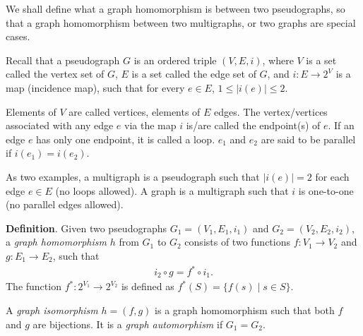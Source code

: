 \documentclass[12pt]{article}
\begin{document}
We shall define what a graph homomorphism is between two pseudographs, so that a graph homomorphism between two multigraphs, or two graphs are special cases.

Recall that a pseudograph $G$ is an ordered triple $(V,E,i)$, where $V$ is a set called the vertex set of $G$, $E$ is a set called the edge set of $G$, and $i:E\to 2^V$ is a map (incidence map), such that for every $e\in E$, $1\le |i(e)|\le 2$.  

Elements of $V$ are called vertices, elements of $E$ edges.  The vertex/vertices associated with any edge $e$ via the map $i$ is/are called the endpoint(s) of $e$.  If an edge $e$ has only one endpoint, it is called a loop.  $e_1$ and $e_2$ are said to be parallel if $i(e_1)=i(e_2)$.  

As two examples, a multigraph is a pseudograph such that $|i(e)|=2$ for each edge $e\in E$ (no loops allowed).  A graph is a multigraph such that $i$ is one-to-one (no parallel edges allowed).

\textbf{Definition}.  Given two pseudographs $G_1=(V_1,E_1,i_1)$ and $G_2=(V_2,E_2,i_2)$, a \emph{graph homomorphism} $h$ from $G_1$ to $G_2$ consists of two functions $f:V_1\to V_2$ and $g:E_1\to E_2$, such that 
\begin{eqnarray}
i_2\circ g=f^*\circ i_1.
\end{eqnarray}
The function $f^*:2^{V_1} \to 2^{V_2}$ is defined as $f^*(S)=\lbrace f(s)\mid s\in S\rbrace$.

A \emph{graph isomorphism} $h=(f,g)$ is a graph homomorphism such that both $f$ and $g$ are bijections.  It is a 
\emph{graph automorphism} if $G_1=G_2$.
\end{document}
